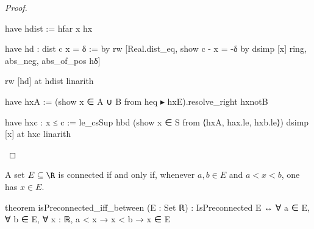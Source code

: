\begin{proof}
\begin{lean}
      have hdist := hfar x hx

      have hd : dist c x = δ := by
        rw [Real.dist_eq, show c - x = -δ by
          dsimp [x]
          ring, abs_neg, abs_of_pos hδ]

      rw [hd] at hdist
      linarith

    have hxA := (show x ∈ A ∪ B from heq ▸ hxE).resolve_right hxnotB

    have hxc : x ≤ c := le_csSup hbd (show x ∈ S from ⟨hxA, hax.le, hxb.le⟩)
    dsimp [x] at hxc
    linarith
  \end{lean}

\end{proof}

\begin{theorem}
  \label{ma:thm:connected-sets-in-R}
  A set $E\subseteq\R$ is connected if and only if, whenever $a,b\in E$ and $a<x<b$, one has $x\in
    E$.

  \begin{lean}
    theorem isPreconnected_iff_between (E : Set ℝ) :
        IsPreconnected E ↔ ∀ a ∈ E, ∀ b ∈ E, ∀ x : ℝ, a < x → x < b → x ∈ E
  \end{lean}
\end{theorem}

